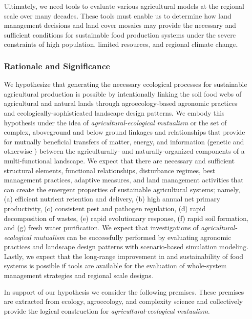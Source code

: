 \documentclass[12pt, letterpaper]{article}
\begin{document}
Ultimately, we need tools to evaluate various agricultural models at the regional scale over many decades. These tools must enable us to determine how land management decisions and land cover mosaics may provide the necessary and sufficient conditions for sustainable food production systems under the severe constraints of high population, limited resources, and regional climate change.

\subsubsection*{Rationale and Significance}
We hypothesize that generating the necessary ecological processes for sustainable agricultural production is possible by intentionally linking the soil food webs of agricultural and natural lands through agroecology-based agronomic practices and ecologically-sophisticated landscape design patterns. We embody this hypothesis under the idea of \textit{agricultural-ecological mutualism} or the set of complex, aboveground and below ground linkages and relationships that provide for mutually beneficial transfers of matter, energy, and information (genetic and otherwise \citep{schreiber_measuring_2000}) between the agriculturally- and naturally-organized components of a multi-functional landscape. We expect that there are necessary and sufficient structural elements, functional relationships, disturbance regimes, best management practices, adaptive measures, and land management activities that can create the emergent properties of sustainable agricultural systems; namely, (a) efficient nutrient retention and delivery, (b) high annual net primary productivity, (c) consistent pest and pathogen regulation, (d) rapid decomposition of wastes, (e) rapid evolutionary response, (f) rapid soil formation, and (g) fresh water purification. We expect that investigations of \textit{agricultural-ecological mutualism} can be successfully performed by evaluating agronomic practices and landscape design patterns with scenario-based simulation modeling. Lastly, we expect that the long-range improvement in and sustainability of food systems is possible if tools are available for the evaluation of whole-system management strategies and regional scale designs.

In support of our hypothesis we consider the following premises. These premises are extracted from ecology, agroecology, and complexity science and collectively provide the logical construction for \textit{agricultural-ecological mutualism}.
\end{document}
